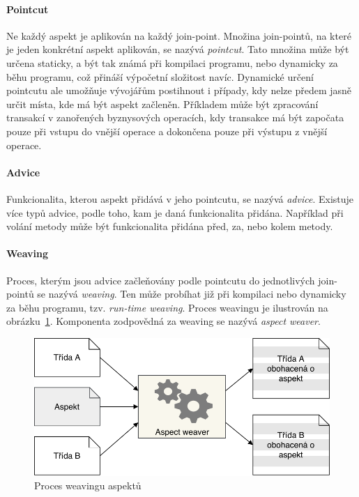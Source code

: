 \paragraph{Pointcut}
Ne každý aspekt je aplikován na každý join-point. Množina join-pointů,
na které je jeden konkrétní aspekt aplikován, se nazývá \textit{pointcut}.
Tato množina může být určena staticky, a být tak známá při kompilaci programu, nebo
dynamicky za běhu programu, což přináší výpočetní složitost navíc.
Dynamické určení pointcutu ale umožňuje vývojářům postihnout i případy,
kdy nelze předem jasně určit místa, kde má být aspekt začleněn.
Příkladem může být zpracování transakcí v zanořených byznysových operacích,
kdy transakce má být započata pouze při vstupu do vnější operace
a dokončena pouze při výstupu z vnější operace.

\paragraph{Advice}
Funkcionalita, kterou aspekt přidává v jeho pointcutu, se nazývá
\textit{advice}. Existuje více typů advice, podle toho, kam je
daná funkcionalita přidána. Například při volání metody může
být funkcionalita přidána před, za, nebo kolem metody.

\paragraph{Weaving}
Proces, kterým jsou advice začleňovány podle pointcutu do
jednotlivých join-pointů se nazývá \textit{weaving}. Ten může
probíhat již při kompilaci nebo dynamicky za běhu programu,
tzv. \textit{run-time weaving}. Proces weavingu je ilustrován
na obrázku~\ref{fig:aspect-weaving}. Komponenta zodpovědná za
weaving se nazývá \textit{aspect weaver}.

\begin{figure}[t]
    \centering
    \includegraphics[keepaspectratio=true, width=0.7\linewidth]{figures/aspect-weaving.pdf}
    \caption{Proces weavingu aspektů}
    \label{fig:aspect-weaving}
\end{figure}

